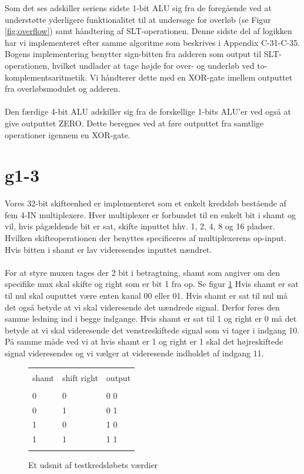 \documentclass[10pt,a4paper,danish]{article}
\begin{document}
Som det ses adskiller seriens sidste 1-bit ALU sig fra de foregående ved at understøtte yderligere funktionalitet
til at undersøge for overløb (se Figur \ref{fig:overflow}) samt håndtering af SLT-operationen. Denne sidste del af 
logikken har vi implementeret efter samme algoritme som beskrives i Appendix C-31-C-35. Bogens implementering
benytter sign-bitten fra adderen som output til SLT-operationen, hvilket undlader at tage højde for 
over- og underløb ved to-komplementsaritmetik. Vi håndterer dette med en XOR-gate imellem outputtet fra 
overløbsmodulet og adderen. 
 
\paragraph{}
Den færdige 4-bit ALU adskiller sig fra de forskellige 1-bits ALU'er ved også at give outputtet ZERO. Dette 
beregnes ved at føre outputtet fra samtlige operationer igennem en XOR-gate. 

\section{g1-3}
Vores 32-bit skifteenhed er implementeret som et enkelt kredsløb bestående af fem 4-IN multiplexere. 
Hver multiplexer er forbundet til en enkelt bit i shamt og vil, hvis pågældende bit er sat, skifte 
inputtet hhv. 1, 2, 4, 8 og 16 pladser. Hvilken skifteoperationen der benyttes specificeres af 
multiplexerens op-input. Hvis bitten i shamt er lav videresendes inputtet uændret.

\paragraph{}
For at styre muxen tages der 2 bit i betragtning, shamt som angiver om den specifike mux skal skifte og right som er bit 1 fra op. Se figur \ref{fig:shifterchoice} 
Hvis shamt er sat til nul skal ouputtet være enten kanal 00 eller 01. Hvis shamt er sat til nul må det også betyde at vi skal videresende det uændrede signal. Derfor føres den samme ledning ind i begge indgange. Hvis shamt er sat til 1 og right er 0 må det betyde at vi skal videresende det venstreskiftede signal som vi tager i indgang 10. På samme måde ved vi at hvis shamt er 1 og right er 1 skal det højreskiftede signal videresendes og vi vælger at videresende indholdet af indgang 11.

\begin{figure}[htb]
  \begin{tabular}{l l | l}
    \hline\\
    shamt & shift right & output\\
    \hline\\
    0 & 0 & 0 0\\
    0 & 1 & 0 1\\
    1 & 0 & 1 0\\
    1 & 1 & 1 1\\
    \hline\\
  \end{tabular}
  \caption{Et udsnit af testkredsløbets værdier}
  \label{fig:shifterchoice}
\end{figure}
\end{document}
